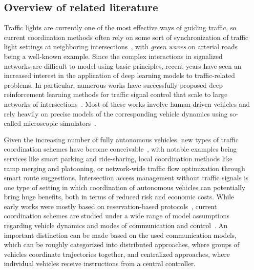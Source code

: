 \documentclass{article}
\theoremstyle{definition}
\theoremstyle{plain}
\begin{document}
\subsection{Overview of related literature}

Traffic lights are currently one of the most effective ways of guiding traffic,
so current coordination methods often rely on some sort of synchronization of
traffic light settings at neighboring intersections~\cite{mcshaneTrafficEngineering1990,hePAMSCODPlatoonbasedArterial2012}, with \textit{green waves} on
arterial roads being a well-known example. Since the complex interactions in
signalized networks are difficult to model using basic principles, recent years
have seen an increased interest in the application of deep learning models to
traffic-related problems. In particular, numerous works have successfully
proposed deep reinforcement learning methods for traffic signal control that
scale to large networks of intersections~\cite{noaeenReinforcementLearningUrban2022,weiSurveyTrafficSignal2020}.
%
Most of these works involve human-driven vehicles and rely heavily on precise
models of the corresponding vehicle dynamics using so-called microscopic
simulators~\cite{lopezMicroscopicTrafficSimulation2018}.

Given the increasing number of fully autonomous vehicles, new types of traffic
coordination schemes have become conceivable~\cite{marianiCoordinationAutonomousVehicles2022}, with notable examples being
services like smart parking and ride-sharing, local coordination methods like
ramp merging and platooning, or network-wide traffic flow optimization through
smart route suggestions.
%
Intersection access management without traffic signals is one type of setting in
which coordination of autonomous vehicles can potentially bring huge benefits,
both in terms of reduced risk and economic costs. While early works were mostly
based on reservation-based protocols~\cite{dresnerMultiagentApproachAutonomous2008}, current coordination schemes are
studied under a wide range of model assumptions regarding vehicle dynamics and
modes of communication and control~\cite{khayatianSurveyIntersectionManagement2020}. An important distinction can be made
based on the used communication models, which can be roughly categorized into
distributed approaches, where groups of vehicles coordinate trajectories
together, and centralized approaches, where individual vehicles receive
instructions from a central controller.
\end{document}
